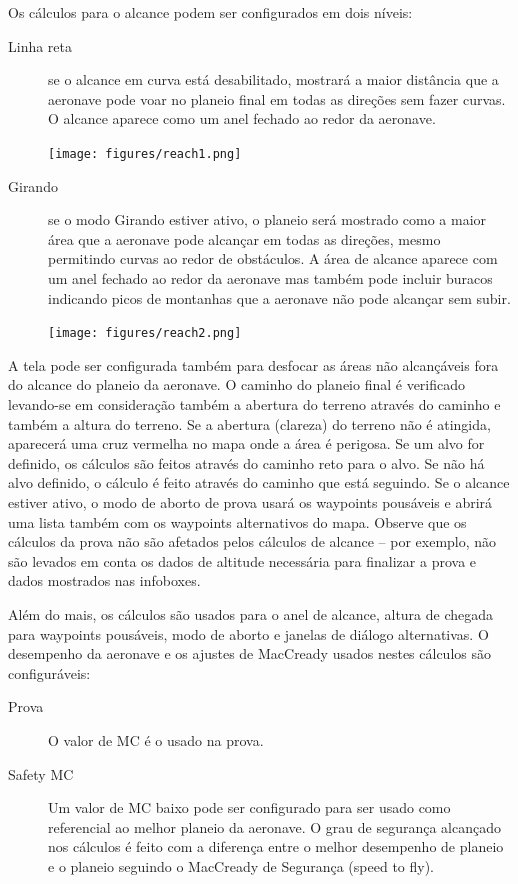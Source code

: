 Os cálculos para o alcance podem ser configurados  em dois níveis: 
\begin{description}
\item[Linha reta] se o alcance em curva está desabilitado, mostrará a maior distância que a aeronave pode voar no planeio final em todas as direções sem fazer curvas.  O alcance aparece como um anel fechado ao redor da aeronave.  

\begin{center}
\texttt{[image: figures/reach1.png]}
\end{center}

\item[Girando] se o modo Girando estiver ativo, o planeio será mostrado como a maior área que a aeronave pode alcançar em todas as direções, mesmo permitindo curvas ao redor de obstáculos.  A área de alcance aparece com um anel fechado ao redor da aeronave mas também pode incluir buracos indicando picos de montanhas que a aeronave não pode alcançar sem subir.

\begin{center}
\texttt{[image: figures/reach2.png]}
\end{center}

\end{description}

A tela pode ser configurada também para desfocar as áreas não alcançáveis fora do alcance do planeio da aeronave.  O caminho do planeio final é verificado levando-se em consideração também a abertura do terreno através do caminho e também a altura do terreno.
Se a abertura (clareza) do terreno não é atingida, aparecerá uma cruz vermelha no mapa onde a área é perigosa.  Se um alvo for definido, os cálculos são feitos através do caminho reto para o alvo.  Se não há alvo definido, o cálculo é feito através do caminho que está seguindo.
Se o alcance estiver ativo, o modo de aborto de prova usará os waypoints pousáveis e abrirá uma lista também com os waypoints alternativos do mapa.
Observe que os cálculos da prova não são afetados pelos cálculos de alcance – por exemplo, não são levados em conta os dados de altitude necessária para finalizar a prova e dados mostrados nas infoboxes.

Além do mais, os cálculos são usados para o anel de alcance, altura de chegada para waypoints pousáveis, modo de aborto e janelas de diálogo alternativas.  O desempenho da aeronave e os ajustes de MacCready usados nestes cálculos são configuráveis:
\begin{description}
\item[Prova] O valor de MC é o usado na prova.
\item[Safety MC] Um valor de MC baixo pode ser configurado para ser usado como referencial ao melhor planeio da aeronave.  O grau de segurança alcançado nos cálculos é feito com a diferença entre o melhor desempenho de planeio e o planeio seguindo o MacCready de Segurança (speed to fly).  
\end{description}

